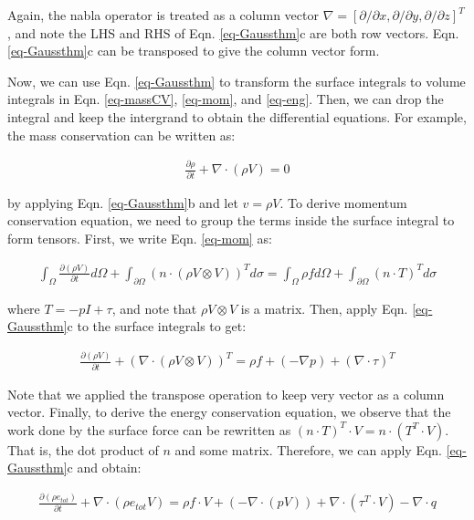 \documentclass[11pt, letterpaper]{report}
\begin{document}
Again, the nabla operator is treated as a column vector $\nabla = [\partial/\partial x,
\partial/\partial y, \partial/\partial z]^T$, and note the LHS and RHS of Eqn. \ref{eq-Gaussthm}c
are both row vectors. Eqn. \ref{eq-Gaussthm}c can be transposed to give the column vector form.
\paraspace

Now, we can use Eqn. \ref{eq-Gaussthm} to transform the surface integrals to volume integrals in
Eqn. \ref{eq-massCV}, \ref{eq-mom}, and \ref{eq-eng}. Then, we can drop the integral and keep the
intergrand to obtain the differential equations. For example, the mass conservation can be written
as:

\begin{align}\label{eq-massDf}
   \frac{\partial \rho}{\partial t} + \nabla \cdot (\rho V) = 0
\end{align}

by applying Eqn. \ref{eq-Gaussthm}b and let $v = \rho V$. To derive momentum conservation equation,
we need to group the terms inside the surface integral to form tensors. First, we write Eqn.
\ref{eq-mom} as:

\begin{align}\label{eq-momTs}
   \int_\Omega \frac{\partial(\rho V)}{\partial t}d\Omega + \int_{\partial\Omega} \left(n \cdot (\rho
   V \mathop{\otimes} V)\right)^T d\sigma = \int_\Omega \rho f d\Omega + \int_{\partial\Omega} (n
   \cdot T)^T d\sigma
\end{align}

where $T = -pI + \tau$, and note that $\rho V \mathop{\otimes} V$ is a matrix. Then, apply Eqn.
\ref{eq-Gaussthm}c to the surface integrals to get:

\begin{align}\label{eq-momDf}
   \frac{\partial (\rho V)}{\partial t} + \left(\nabla \cdot (\rho V \mathop{\otimes} V)\right)^T = \rho f
   + (-\nabla p) + (\nabla \cdot \tau)^T
\end{align}

Note that we applied the transpose operation to keep very vector as a column vector. Finally, to
derive the energy conservation equation, we observe that the work done by the surface force can be
rewritten as $(n \cdot T)^T \cdot V = n \cdot (T^T \cdot V)$. That is, the dot product of $n$ and
some matrix. Therefore, we can apply Eqn. \ref{eq-Gaussthm}c and obtain:

\begin{align}\label{eq-engDf}
   \frac{\partial (\rho e_{tot})}{\partial t} + \nabla \cdot (\rho e_{tot} V) = \rho f \cdot V +
   (-\nabla \cdot (pV)) + \nabla \cdot (\tau^T \cdot V) - \nabla \cdot q
\end{align}
\end{document}
